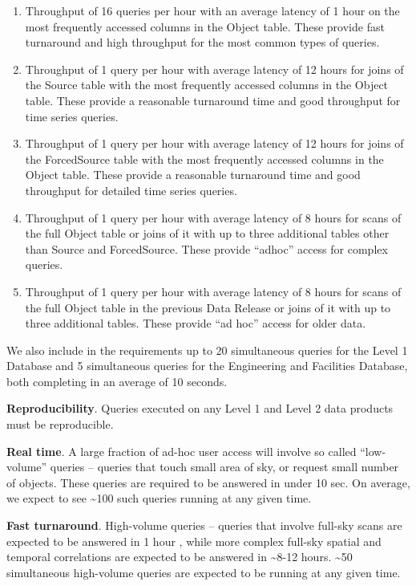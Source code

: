 \documentclass[DM,lsstdraft,toc]{lsstdoc}
\begin{document}
\begin{enumerate}
  \begin{enumerate}
  \def\labelenumii{\Alph{enumii}.}
  \item
    Throughput of 16 queries per hour with an average latency of 1 hour
    on the most frequently accessed columns in the Object table. These
    provide fast turnaround and high throughput for the most common
    types of queries.
  \item
    Throughput of 1 query per hour with average latency of 12 hours for
    joins of the Source table with the most frequently accessed columns
    in the Object table. These provide a reasonable turnaround time and
    good throughput for time series queries.
  \item
    Throughput of 1 query per hour with average latency of 12 hours for
    joins of the ForcedSource table with the most frequently accessed
    columns in the Object table. These provide a reasonable turnaround
    time and good throughput for detailed time series queries.
  \item
    Throughput of 1 query per hour with average latency of 8 hours for
    scans of the full Object table or joins of it with up to three
    additional tables other than Source and ForcedSource. These provide
    ``adhoc'' access for complex queries.
  \item
    Throughput of 1 query per hour with average latency of 8 hours for
    scans of the full Object table in the previous Data Release or joins
    of it with up to three additional tables. These provide ``ad hoc''
    access for older data.
  \end{enumerate}
\end{enumerate}

We also include in the requirements up to 20 simultaneous queries for
the Level 1 Database and 5 simultaneous queries for the Engineering and
Facilities Database, both completing in an average of 10 seconds.

\textbf{Reproducibility}. Queries executed on any Level 1 and Level 2
data products must be reproducible.

\textbf{Real time}. A large fraction of ad-hoc user access will involve
so called ``low-volume'' queries -- queries that touch small area of
sky, or request small number of objects. These queries are required to
be answered in under 10 sec. On average, we expect to see
\textasciitilde{}100 such queries running at any given time.

\textbf{Fast turnaround}. High-volume queries -- queries that involve
full-sky scans are expected to be answered in 1 hour , while more
complex full-sky spatial and temporal correlations are expected to be
answered in \textasciitilde{}8-12 hours. \textasciitilde{}50
simultaneous high-volume queries are expected to be running at any given
time.
\end{document}
